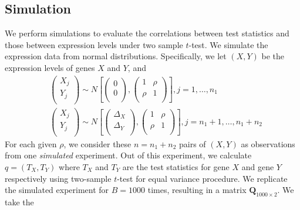 \documentclass[12pt, a4paper]{article}
\begin{document}
\subsection{Simulation}
We perform simulations to evaluate the correlations between test statistics and those between 
expression levels under two sample $t$-test. We simulate the expression data from normal 
distributions. Specifically, we let $(X, Y)$ be the expression levels of genes $X$ and $Y$, and
\begin{equation}
\begin{aligned}
&\left( \begin{array}{c}
X_{j}\\
Y_{j}\\
\end{array}\right)
\sim N\left[
\left(\begin{array}{c}
0\\
0\\
\end{array} \right), 
\left(
\begin{array}{cc}
1 &\rho  \\
\rho & 	1 \\
\end{array}
\right)
\right], j = 1, \ldots, n_1 \\
& \left( \begin{array}{c}
X_{j}\\
Y_{j}\\
\end{array}\right)
\sim N\left[
\left(\begin{array}{c}
\Delta_X\\
\Delta_Y\\
\end{array} \right), 
\left(
\begin{array}{cc}
1 &\rho \\
\rho  & 	1 \\
\end{array}
\right)
\right], j = n_1 +1, \ldots, n_1 + n_2 
\end{aligned}
\end{equation}
For each given $\rho$, we 
consider these $n=n_1 + n_2$ pairs of $(X, Y)$
as observations from one \textit{simulated} experiment. Out of this experiment, we calculate $q 
= (T_X, T_Y)$ where $T_X$ and $T_Y$ are the test statistics for gene $X$ and gene $Y$ 
respectively using 
two-sample $t$-test for equal variance procedure. We replicate the simulated
experiment for $B=1000$ times, resulting in a matrix $\bm Q_{1000\times 2}$. We take the 
\end{document}
